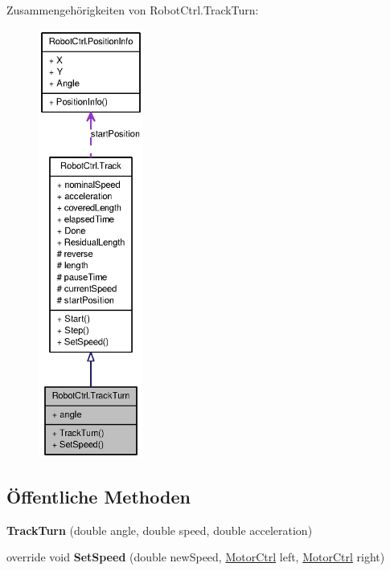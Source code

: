 Zusammengehörigkeiten von RobotCtrl.TrackTurn:\nopagebreak
\begin{figure}[H]
\begin{center}
\leavevmode
\includegraphics[height=400pt]{class_robot_ctrl_1_1_track_turn__coll__graph}
\end{center}
\end{figure}
\subsection*{Öffentliche Methoden}
\begin{DoxyCompactItemize}
\item 
\hypertarget{class_robot_ctrl_1_1_track_turn_a734b50f5f72a3521d15855b0f86d2c6c}{
{\bfseries TrackTurn} (double angle, double speed, double acceleration)}
\label{class_robot_ctrl_1_1_track_turn_a734b50f5f72a3521d15855b0f86d2c6c}

\item 
\hypertarget{class_robot_ctrl_1_1_track_turn_a065e23cd313e746cb65496c9b9df0955}{
override void {\bfseries SetSpeed} (double newSpeed, \hyperlink{class_robot_ctrl_1_1_motor_ctrl}{MotorCtrl} left, \hyperlink{class_robot_ctrl_1_1_motor_ctrl}{MotorCtrl} right)}
\label{class_robot_ctrl_1_1_track_turn_a065e23cd313e746cb65496c9b9df0955}

\end{DoxyCompactItemize}
